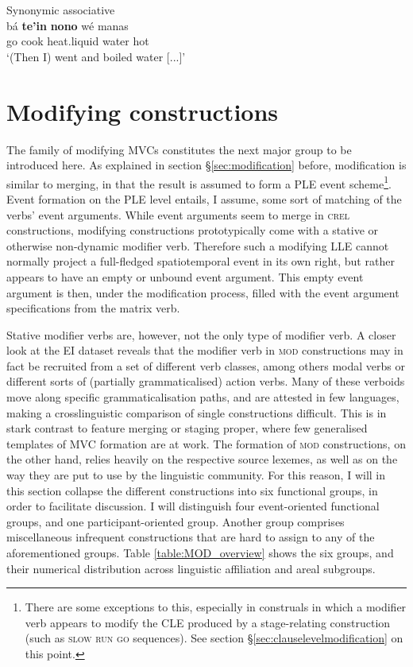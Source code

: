 \ea Synonymic associative \label{} \\
\gll bá \textbf{te'in} \textbf{nono} wé manas \\
go cook heat.liquid water hot \\
\glft `(Then I) went and boiled water [...]' \\ 
\z
\xe

\section{Modifying constructions}

The family of modifying MVCs constitutes the next major group to be introduced here. As explained in section §\ref{sec:modification} before, modification is similar to merging, in that the result is assumed to form a PLE event scheme\footnote{There are some exceptions to this, especially in construals in which a modifier verb appears to modify the CLE produced by a stage-relating construction (such as \textsc{slow} \textsc{run} \textsc{go} sequences). See section §\ref{sec:clauselevelmodification} on this point.}. Event formation on the PLE level entails, I assume, some sort of matching of the verbs' event arguments. While event arguments seem to merge in \textsc{crel} constructions, modifying constructions prototypically come with a stative or otherwise non-dynamic modifier verb. Therefore such a modifying LLE cannot normally project a full-fledged spatiotemporal event in its own right, but rather appears to have an empty or unbound event argument. This empty event argument is then, under the modification process, filled with the event argument specifications from the matrix verb.

Stative modifier verbs are, however, not the only type of modifier verb. A closer look at the EI dataset reveals that the modifier verb in \textsc{mod} constructions may in fact be recruited from a set of different verb classes, among others modal verbs or different sorts of (partially grammaticalised) action verbs. Many of these verboids move along specific grammaticalisation paths, and are attested in few languages, making a crosslinguistic comparison of single constructions difficult. This is in stark contrast to feature merging or staging proper, where few generalised templates of MVC formation are at work. The formation of \textsc{mod} constructions, on the other hand, relies heavily on the respective source lexemes, as well as on the way they are put to use by the linguistic community. For this reason, I will in this section collapse the different constructions into six functional groups, in order to facilitate discussion. I will distinguish four event-oriented functional groups, and one participant-oriented group. Another group comprises miscellaneous infrequent constructions that are hard to assign to any of the aforementioned groups. Table \ref{table:MOD_overview} shows the six groups, and their numerical distribution across linguistic affiliation and areal subgroups.

